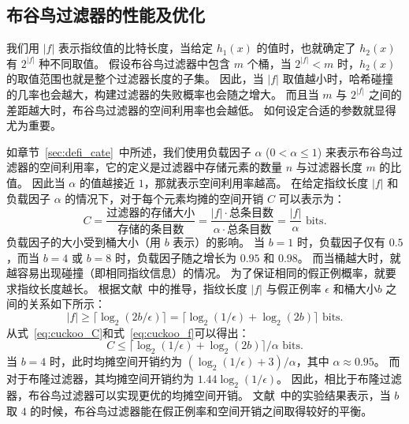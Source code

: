 \subsection{布谷鸟过滤器的性能及优化}

我们用 $|f|$ 表示指纹值的比特长度，当给定 $h_1(x)$ 的值时，也就确定了 $h_2(x)$ 有 $2^{|f|}$ 种不同取值。
假设布谷鸟过滤器中包含 $m$ 个桶，当 $2^{|f|} < m$ 时，$h_2(x)$ 的取值范围也就是整个过滤器长度的子集。
因此，当 $|f|$ 取值越小时，哈希碰撞的几率也会越大，构建过滤器的失败概率也会随之增大。
而且当 $m$ 与 $2^{|f|}$ 之间的差距越大时，布谷鸟过滤器的空间利用率也会越低。
如何设定合适的参数就显得尤为重要。


如章节~\ref{sec:defi_cate}~中所述，我们使用负载因子 $\alpha$ ($0< \alpha \leq 1$) 来表示布谷鸟过滤器的空间利用率，它的定义是过滤器中存储元素的数量 $n$ 与过滤器长度 $m$ 的比值。
因此当 $\alpha$ 的值越接近 $1$，那就表示空间利用率越高。
在给定指纹长度 $|f|$ 和负载因子 $\alpha$ 的情况下，对于每个元素均摊的空间开销 $C$ 可以表示为：
\begin{equation}
  C = \frac{\mbox{过滤器的存储大小}}{\mbox{存储的条目数}} = \frac{|f| \cdot \mbox{总条目数}}{\alpha \cdot \mbox{总条目数}} = \frac{|f|}{\alpha} \mbox{ bits}.
  \label{eq:cuckoo_C}
\end{equation}
负载因子的大小受到桶大小（用 $b$ 表示）的影响。
当 $b=1$ 时，负载因子仅有 $0.5$，而当 $b=4$ 或 $b=8$ 时，负载因子随之增长为 $0.95$ 和 $0.98$。
而当桶越大时，就越容易出现碰撞（即相同指纹信息）的情况。
为了保证相同的假正例概率，就要求指纹长度越长。
根据文献~\cite{fan2014cuckoo}中的推导，指纹长度 $|f|$ 与假正例率 $\epsilon$ 和桶大小$b$ 之间的关系如下所示：
\begin{equation}
  |f| \geq \lceil\log_2(2b / \epsilon) \rceil = \lceil \log_2(1/\epsilon) + \log_2(2b) \rceil \mbox{ bits}.
  \label{eq:cuckoo_f}
\end{equation}
从式~\ref{eq:cuckoo_C}和式~\ref{eq:cuckoo_f}可以得出：
\begin{equation}
  C \leq \lceil \log_2(1/\epsilon) + \log_2(2b) \rceil / \alpha \mbox{ bits}.
  \label{eq:cuckoo_storage}
\end{equation}
当 $b=4$ 时，此时均摊空间开销约为 $(\log_2(1/\epsilon) + 3) / \alpha$，其中 $\alpha \approx 0.95$。
而对于布隆过滤器，其均摊空间开销约为 $1.44 \log_2(1/ \epsilon)$。
因此，相比于布隆过滤器，布谷鸟过滤器可以实现更优的均摊空间开销。
文献~\cite{fan2014cuckoo}中的实验结果表示，当 $b$ 取 $4$ 的时候，布谷鸟过滤器能在假正例率和空间开销之间取得较好的平衡。

